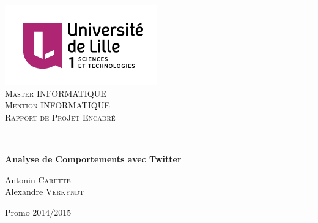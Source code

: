 \documentclass[pdftex,12pt,a4paper]{report}
\newcommand{\HRule}{\rule{\linewidth}{1mm}}
\begin{document}
\begin{titlepage}
  \begin{sffamily}
  \begin{center}

    \includegraphics[scale=0.6]{./img/univ-lille1.png}~\\[1.5cm]
    
    \textsc{\Large Master INFORMATIQUE}\\[0.5cm]
    
    \textsc{\Large Mention INFORMATIQUE}\\[2cm]

    \textsc{\LARGE Rapport de ProJet Encadré}\\[2cm]

    \HRule \\[0.4cm]
    { \huge \bfseries Analyse de Comportements avec Twitter\\[0.4cm] }

   \vfill

    \begin{minipage}{0.4\textwidth}
      \begin{flushleft} \large
        Antonin \textsc{Carette}\\
        Alexandre \textsc{Verkyndt}\\
      \end{flushleft}
    \end{minipage}
    
    \vfill

    {\large Promo 2014/2015}

  \end{center}
  \end{sffamily}
\end{titlepage}
\end{document}
